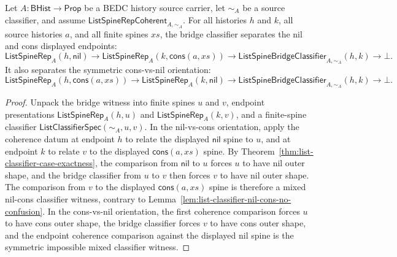 \begin{theorem}
\label{thm:list-spine-bridge-nil-cons-separation-under-coherence}
Let $A:\mathsf{BHist}\to\mathsf{Prop}$ be a BEDC history source carrier, let
$\sim_A$ be a source classifier, and assume
$\mathsf{ListSpineRepCoherent}_{A,\sim_A}$. For all histories $h$ and $k$, all
source histories $a$, and all finite spines $xs$, the bridge classifier separates
the nil and cons displayed endpoints:
$$
\mathsf{ListSpineRep}_A(h,\mathsf{nil})
\to
\mathsf{ListSpineRep}_A(k,\mathsf{cons}(a,xs))
\to
\mathsf{ListSpineBridgeClassifier}_{A,\sim_A}(h,k)
\to
\bot.
$$
It also separates the symmetric cons-vs-nil orientation:
$$
\mathsf{ListSpineRep}_A(h,\mathsf{cons}(a,xs))
\to
\mathsf{ListSpineRep}_A(k,\mathsf{nil})
\to
\mathsf{ListSpineBridgeClassifier}_{A,\sim_A}(h,k)
\to
\bot.
$$
\end{theorem}
\begin{proof}
Unpack the bridge witness into finite spines $u$ and $v$, endpoint presentations
$\mathsf{ListSpineRep}_A(h,u)$ and $\mathsf{ListSpineRep}_A(k,v)$, and a
finite-spine classifier $\mathsf{ListClassifierSpec}(\sim_A,u,v)$. In the
nil-vs-cons orientation, apply the coherence datum at endpoint $h$ to relate the
displayed $\mathsf{nil}$ spine to $u$, and at endpoint $k$ to relate $v$ to the
displayed $\mathsf{cons}(a,xs)$ spine. By
Theorem~\ref{thm:list-classifier-case-exactness}, the comparison from
$\mathsf{nil}$ to $u$ forces $u$ to have nil outer shape, and the bridge
classifier from $u$ to $v$ then forces $v$ to have nil outer shape. The
comparison from $v$ to the displayed $\mathsf{cons}(a,xs)$ spine is therefore a
mixed nil-cons classifier witness, contrary to
Lemma~\ref{lem:list-classifier-nil-cons-no-confusion}. In the cons-vs-nil
orientation, the first coherence comparison forces $u$ to have cons outer shape,
the bridge classifier forces $v$ to have cons outer shape, and the endpoint
coherence comparison against the displayed nil spine is the symmetric impossible
mixed classifier witness.
\end{proof}



